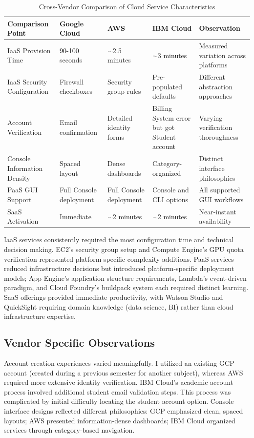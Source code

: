\documentclass[11pt,a4paper]{article}
\begin{document}
\begin{table}[h]
\centering
\small
\caption{Cross-Vendor Comparison of Cloud Service Characteristics}
\begin{tabular}{@{}p{2.8cm}p{2.6cm}p{2.6cm}p{2.6cm}p{3.2cm}@{}}
\toprule
\textbf{Comparison Point} & \textbf{Google Cloud} & \textbf{AWS} & \textbf{IBM Cloud} & \textbf{Observation} \\
\midrule
IaaS Provision Time & 90-100 seconds & $\sim$2.5 minutes & $\sim$3 minutes & Measured variation across platforms \\
\addlinespace[0.3em]
IaaS Security Configuration & Firewall checkboxes & Security group rules & Pre-populated defaults & Different abstraction approaches \\
\addlinespace[0.3em]
Account Verification & Email confirmation & Detailed identity forms & Billing System error but got Student account & Varying verification thoroughness \\
\addlinespace[0.3em]
Console Information Density & Spaced layout & Dense dashboards & Category-organized & Distinct interface philosophies \\
\addlinespace[0.3em]
PaaS GUI Support & Full Console deployment & Full Console deployment & Console and CLI options & All supported GUI workflows \\
\addlinespace[0.3em]
SaaS Activation & Immediate & $\sim$2 minutes & $\sim$2 minutes & Near-instant availability \\
\bottomrule
\end{tabular}
\end{table}

IaaS services consistently required the most configuration time and technical decision making. EC2's security group setup and Compute Engine's GPU quota verification represented platform-specific complexity additions. PaaS services reduced infrastructure decisions but introduced platform-specific deployment models; App Engine's application structure requirements, Lambda's event-driven paradigm, and Cloud Foundry's buildpack system each required distinct learning. SaaS offerings provided immediate productivity, with Watson Studio and QuickSight requiring domain knowledge (data science, BI) rather than cloud infrastructure expertise.

\subsection{Vendor Specific Observations}

Account creation experiences varied meaningfully. I utilized an existing GCP account (created during a previous semester for another subject), whereas AWS required more extensive identity verification. IBM Cloud's academic account process involved additional student email validation steps. This process was complicated by initial difficulty locating the student account option. Console interface designs reflected different philosophies: GCP emphasized clean, spaced layouts; AWS presented information-dense dashboards; IBM Cloud organized services through category-based navigation.
\end{document}
